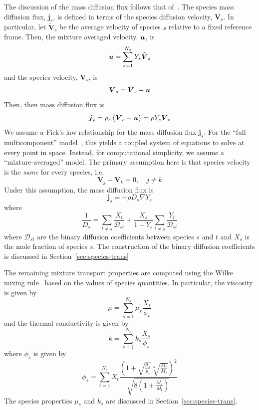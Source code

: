 The discussion of the mass diffusion flux follows that of~\cite{Kee}.
The species mass diffusion flux, $\boldsymbol{j}_s$, is defined in terms
of the species diffusion velocity, $\boldsymbol{V}_s$. In particular,
let $\tilde{\boldsymbol{V}}_s$ be the average velocity of species $s$
relative to a fixed reference frame. Then, the mixture averaged
velocity, $\boldsymbol{u}$, is
%
\begin{equation}
  \boldsymbol{u} = \sum_{s=1}^{N_s} Y_s \tilde{\boldsymbol{V}}_s
\end{equation}
%
and the species velocity, $\boldsymbol{V}_s$, is
%
\begin{equation}
  \boldsymbol{V}_s = \tilde{\boldsymbol{V}}_s - \boldsymbol{u}
\end{equation}
%
Then, then mass diffusion flux is
%
\begin{equation}
  \boldsymbol{j}_s = \rho_s \left( \tilde{\boldsymbol{V}}_s - \boldsymbol{u}
  \right) = \rho Y_s \boldsymbol{V}_s
\end{equation}
%
We assume a Fick's law relationship for the mass diffusion flux
$\boldsymbol{j}_s$. For the ``full multicomponent'' model~\cite{Kuo}, this yields
a coupled system of equations to solve at every point in
space. Instead, for computational simplicity, we assume a
``mixture-averaged'' model. The primary assumption here is that
species velocity is the \emph{same} for every species, i.e.
%
\begin{equation}
  \boldsymbol{V}_j - \boldsymbol{V}_k = 0, \quad j \ne k
\end{equation}
%
Under this assumption, the mass diffusion flux is
%
\begin{equation}
  \boldsymbol{j}_s = -\rho D_s \nabla Y_s
\end{equation}
%
where
%
\begin{equation}
  \frac{1}{D_s} = \sum_{t\ne s} \frac{X_t}{\mathcal{D}_{st}} +
  \frac{X_s}{1-Y_s} \sum_{t\ne s} \frac{Y_t}{\mathcal{D}_{st}}
\end{equation}
%
where $\mathcal{D}_{st}$ are the binary diffusion coefficients between
species $s$ and $t$ and $X_s$ is the mole fraction of species $s$. The
construction of the binary diffusion coefficients is discussed in
Section~\ref{sec:species-trans}


The remaining mixture transport properties are computed using the
Wilke mixing rule~\cite{Wilke} based on the values of species
quantities. In particular, the viscosity is given by
%
\begin{equation}
\mu = \sum_{s=1}^{N_s} \mu_s \frac{X_s}{\phi_s}
\end{equation}
%
and the thermal conductivity is given by
%
\begin{equation}
k = \sum_{s=1}^{N_s} k_s \frac{X_s}{\phi_s}
\end{equation}
%
where $\phi_s$ is given by
%
\begin{equation}
\phi_s = \sum_{t=1}^{N_s} X_t \frac{ \left(1 +
  \sqrt{\frac{\mu_s}{\mu_t}}\sqrt[4]{\frac{M_t}{M_s}}\right)^2}{\sqrt{8\left(
1+ \frac{M_s}{M_t}\right)}}
\end{equation}
%
The species properties $\mu_s$ and $k_s$ are discussed in
Section~\ref{sec:species-trans}.

